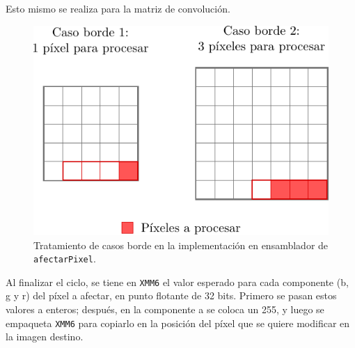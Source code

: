         Esto mismo se realiza para la matriz de convolución.
          
        \begin{figure}
          \centering \includegraphics{imagenes/casos-borde-asm.pdf}
          \caption{Tratamiento de casos borde en la implementación en ensamblador de \texttt{afectarPixel}.} \label{fig:casos-borde-asm}
        \end{figure}

        Al finalizar el ciclo, se tiene en \texttt{XMM6} el valor esperado para cada componente (\textsf{b}, \textsf{g} y \textsf{r}) del píxel a afectar, en punto flotante de 32 bits. Primero se pasan estos valores a enteros; después, en la componente \textsf{a} se coloca un 255, y luego se empaqueta \texttt{XMM6} para copiarlo en la posición del píxel que se quiere modificar en la imagen destino.
